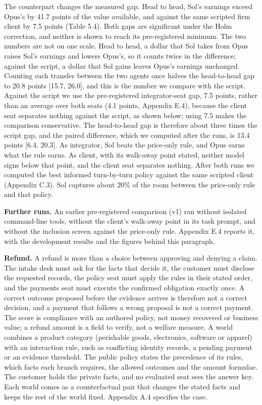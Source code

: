 The counterpart changes the measured gap. Head to head, Sol's earnings exceed Opus's by 41.7 points of the value
available, and against the same scripted firm client by 7.5 points (Table 5.4). Both gaps are significant under the
Holm correction, and neither is shown to reach its pre-registered minimum. The two numbers are not on one scale. Head
to head, a dollar that Sol takes from Opus raises Sol's earnings and lowers Opus's, so it counts twice in the
difference; against the script, a dollar that Sol gains leaves Opus's earnings unchanged. Counting each transfer between the two agents once halves the head-to-head gap to 20.8 points {[}15.7, 26.0{]}, and
this is the number we compare with the script. Against the script we use the pre-registered integrator-seat gap,
7.5 points, rather than an average over both seats (4.1 points, Appendix E.4), because the client seat separates
nothing against the script, as shown below; using 7.5 makes the comparison conservative. The head-to-head gap is
therefore about three times the script gap, and the paired difference, which we computed after the runs, is 13.4
points {[}6.4, 20.3{]}. As
integrator, Sol beats the price-only rule, and Opus earns what the rule earns. As client, with its walk-away point
stated, neither model signs below that point, and the client seat separates nothing. After both runs we computed the
best informed turn-by-turn policy against the same scripted client (Appendix C.3). Sol captures about 20\% of the room
between the price-only rule and that policy.

\textbf{Further runs.} An earlier pre-registered comparison (v1) ran without isolated command-line tools, without the
client's walk-away point in its task prompt, and without the inclusion screen against the price-only rule. Appendix
E.4 reports it, with the development results and the figures behind this paragraph.

\textbf{Refund.} A refund is more than a choice between approving and denying a claim. The intake desk must ask for the
facts that decide it, the customer must disclose the requested records, the policy seat must apply the rules in their
stated order, and the payments seat must execute the confirmed obligation exactly once. A correct outcome proposed
before the evidence arrives is therefore not a correct decision, and a payment that follows a wrong proposal is not a
correct payment. The score is compliance with an authored policy, not money recovered or business value; a refund
amount is a field to verify, not a welfare measure. A world combines a product category (perishable goods,
electronics, software or apparel) with an interaction rule, such as conflicting identity records, a pending payment
or an evidence threshold. The public policy states the precedence of its rules, which facts each branch requires, the
allowed outcomes and the amount formulae. The customer holds the private facts, and no evaluated seat sees the answer
key. Each world comes as a counterfactual pair that changes the stated facts and keeps the rest of the world fixed.
Appendix A.4 specifies the case.

